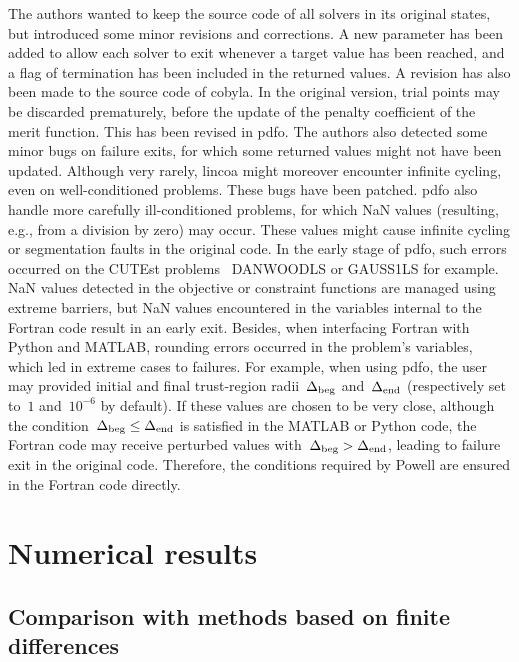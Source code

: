 \documentclass[
    smallextended,  %
    final,        %
]{svjour3}
\newcommand{\rad}[1][k]{\Delta\ifthenelse{\equal{#1}{}}{}{_{#1}}}
\begin{document}
The authors wanted to keep the source code of all solvers in its original states, but introduced some minor revisions and corrections.
A new parameter has been added to allow each solver to exit whenever a target value has been reached, and a flag of termination has been included in the returned values.
A revision has also been made to the source code of \gls{cobyla}.
In the original version, trial points may be discarded prematurely, before the update of the penalty coefficient of the merit function.
This has been revised in \gls{pdfo}.
The authors also detected some minor bugs on failure exits, for which some returned values might not have been updated.
Although very rarely, \gls{lincoa} might moreover encounter infinite cycling, even on well-conditioned problems.
These bugs have been patched.
\Gls{pdfo} also handle more carefully ill-conditioned problems, for which NaN values (resulting, e.g., from a division by zero) may occur.
These values might cause infinite cycling or segmentation faults in the original code.
In the early stage of \gls{pdfo}, such errors occurred on the CUTEst problems~\cite{Gould_Orban_Toint_2015} DANWOODLS or GAUSS1LS for example.
NaN values detected in the objective or constraint functions are managed using extreme barriers, but NaN values encountered in the variables internal to the Fortran code result in an early exit.
Besides, when interfacing Fortran with Python and MATLAB, rounding errors occurred in the problem's variables, which led in extreme cases to failures.
For example, when using \gls{pdfo}, the user may provided initial and final trust-region radii~$\rad[\text{beg}]$ and~$\rad[\text{end}]$ (respectively set to~$1$ and~$10^{-6}$ by default).
If these values are chosen to be very close, although the condition~$\rad[\text{beg}] \le \rad[\text{end}]$ is satisfied in the MATLAB or Python code, the Fortran code may receive perturbed values with~$\rad[\text{beg}] > \rad[\text{end}]$, leading to failure exit in the original code.
Therefore, the conditions required by Powell are ensured in the Fortran code directly.


\section{Numerical results}
\label{sec:numerical}

\subsection{Comparison with methods based on finite differences}
\label{ssec:fd}
\end{document}
